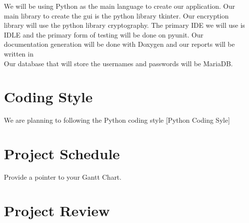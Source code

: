 \documentclass{article}
\begin{document}
We will be using Python as the main language to create our application. Our main library to create the gui is the python library tkinter. Our encryption library will use the python library cryptography. The primary IDE we will use is IDLE and the primary form of testing will be done on pyunit. Our documentation generation will be done with Doxygen and our reports will be written in \latex \\
Our database that will store the usernames and passwords will be MariaDB.

\section{Coding Style}

We are planning to following the Python coding style
\href{https://google.github.io/styleguide/pyguide.html}[Python Coding Syle]

\section{Project Schedule}

Provide a pointer to your Gantt Chart.

\section{Project Review}
\end{document}
